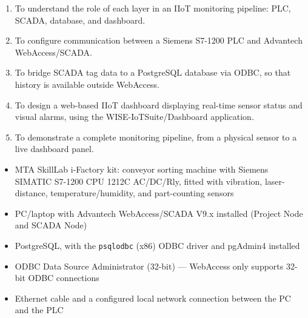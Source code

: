 
\begin{objectives}
  \begin{enumerate}
    \item To understand the role of each layer in an IIoT monitoring pipeline: PLC, SCADA, database, and dashboard.
    \item To configure communication between a Siemens S7-1200 PLC and Advantech WebAccess/SCADA.
    \item To bridge SCADA tag data to a PostgreSQL database via ODBC, so that history is available outside WebAccess.
    \item To design a web-based IIoT dashboard displaying real-time sensor status and visual alarms, using the WISE-IoTSuite/Dashboard application.
    \item To demonstrate a complete monitoring pipeline, from a physical sensor to a live dashboard panel.
  \end{enumerate}
\end{objectives}

\begin{equipment}
  \begin{itemize}
    \item MTA SkillLab i-Factory kit: conveyor sorting machine with Siemens SIMATIC S7-1200 CPU 1212C AC/DC/Rly, fitted with vibration, laser-distance, temperature/humidity, and part-counting sensors
    \item PC/laptop with Advantech WebAccess/SCADA V9.x installed (Project Node and SCADA Node)
    \item PostgreSQL, with the \texttt{psqlodbc} (x86) ODBC driver and pgAdmin4 installed
    \item ODBC Data Source Administrator (32-bit) --- WebAccess only supports 32-bit ODBC connections
    \item Ethernet cable and a configured local network connection between the PC and the PLC
  \end{itemize}
\end{equipment}
\newpage

